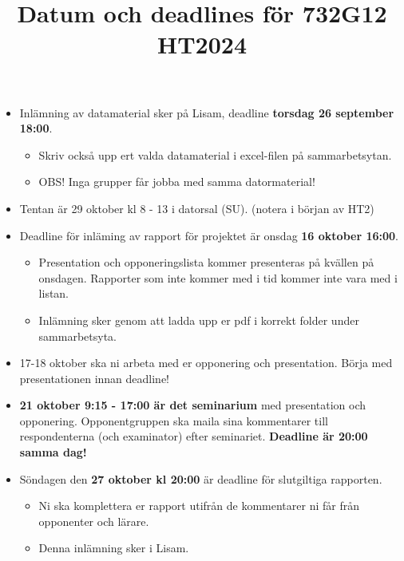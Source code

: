 \documentclass[a4paper]{article}
\title{Datum och deadlines för 732G12 HT2024}
\author{}
\date{}
\begin{document}
\maketitle
\thispagestyle{fancy}

\begin{itemize}
    \item Inlämning av datamaterial sker på Lisam, deadline \textbf{torsdag 26 september 18:00}.
    \begin{itemize}
        \item Skriv också upp ert valda datamaterial i excel-filen på sammarbetsytan.
        \item OBS! Inga grupper får jobba med samma datormaterial!
    \end{itemize}
    \item Tentan är 29 oktober kl 8 - 13 i datorsal (SU). (notera i början av HT2)
    \item Deadline för inläming av rapport för projektet är onsdag \textbf{16 oktober 16:00}.
    \begin{itemize}
        \item Presentation och opponeringslista kommer presenteras på kvällen på onsdagen. Rapporter som inte kommer med i tid kommer inte vara med i listan.
        \item Inlämning sker genom att ladda upp er pdf i korrekt folder under sammarbetsyta.
    \end{itemize}
    \item 17-18 oktober ska ni arbeta med er opponering och presentation. Börja med presentationen innan deadline!
    \item \textbf{21 oktober 9:15 - 17:00 är det seminarium} med presentation och opponering. Opponentgruppen ska maila sina kommentarer till respondenterna (och examinator) efter seminariet. \textbf{Deadline är 20:00 samma dag!}
    \item Söndagen den \textbf{27 oktober kl 20:00} är deadline för slutgiltiga rapporten.
    \begin{itemize}
        \item Ni ska komplettera er rapport utifrån de kommentarer ni får från opponenter och lärare.
        \item Denna inlämning sker i Lisam.
    \end{itemize}
\end{itemize}
\end{document}
